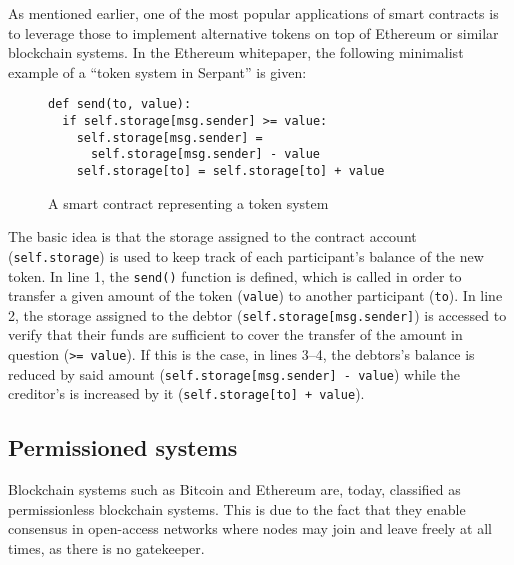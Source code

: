 As mentioned earlier, one of the most popular applications of smart contracts is to leverage those to implement alternative tokens on top of Ethereum or similar blockchain systems.
In the Ethereum whitepaper, the following minimalist example of a ``token system in Serpant'' is given: \autocite[20]{buterin2013a}
\\
\begin{figure}[H]
\begin{lstlisting}
def send(to, value):
  if self.storage[msg.sender] >= value:
    self.storage[msg.sender] =
      self.storage[msg.sender] - value
    self.storage[to] = self.storage[to] + value
\end{lstlisting}
\caption*{A smart contract representing a token system}
\end{figure}


The basic idea is that the storage assigned to the contract account (\texttt{self.storage}) is used to keep track of each participant's balance of the new token.
In line 1, the \texttt{send()} function is defined, which is called in order to transfer a given amount of the token (\texttt{value}) to another participant (\texttt{to}).
In line 2, the storage assigned to the debtor (\texttt{self.storage[msg.sender]}) is accessed to verify that their funds are sufficient to cover the transfer of the amount in question (\texttt{>= value}).
If this is the case, in lines 3--4, the debtors's balance is reduced by said amount (\texttt{self.storage[msg.sender] - value}) while the creditor's is increased by it (\texttt{self.storage[to] + value}).

\subsection{Permissioned systems}

Blockchain systems such as Bitcoin and Ethereum are, today, classified as permissionless blockchain systems.
This is due to the fact that they enable consensus in open-access networks where nodes may join and leave freely at all times, as there is no gatekeeper.

